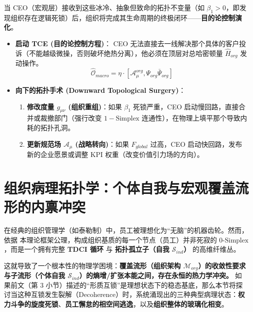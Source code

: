 
当 CEO（宏观层）接收到这些冰冷、抽象但致命的拓扑不变量（如 $\beta_1 > 0$，即发现组织存在逻辑死锁）后，组织将完成其生命周期的终极闭环——\textbf{目的论控制演化}。

\begin{itemize}
    \item \textbf{启动 TCE (目的论控制方程)}：
    CEO 无法直接去一线解决那个具体的客户投诉（不能越级微操，否则破坏绝热分离），他必须在顶层对总哈密顿量 $\hat{H}_{org}$ 发动操作。
    $$ \hat{\mathcal{O}}_{macro} = \eta \cdot \left[ \mathcal{A}_\mu^{org}, \Psi_{org} \bar{\Psi}_{org} \right] $$

    \item \textbf{向下的拓扑手术 (Downward Topological Surgery)}：
    \begin{enumerate}
        \item \textbf{修改度量 $g_{\mu\nu}$ (组织重组)}：如果 $\beta_1$ 死锁严重，CEO 启动慢回路，直接合并或裁撤部门（强行改变 $1-\text{Simplex}$ 连通性），在物理上填平那个导致内耗的拓扑孔洞。
        \item \textbf{更新规范场 $\mathcal{A}_\mu$ (战略转向)}：如果 $F_{global}$ 过高，CEO 启动快回路，发布新的企业愿景或调整 KPI 权重（改变价值引力场的方向）。
    \end{enumerate}
\end{itemize}

\section{组织病理拓扑学：个体自我与宏观覆盖流形的内禀冲突}
\label{sec:org_pathological_topology}

在经典的组织管理学（如泰勒制）中，员工被理想化为“无脑”的机器齿轮。然而，依据 本理论框架公理，构成组织基质的每一个节点（员工）并非死寂的 $0\text{-Simplex}$，而是一个拥有完整 \textbf{TDCI 循环} 与 \textbf{拓扑孤立子（自我 $\mathcal{S}_{ind}$）} 的高维纤维丛。

这就导致了一个根本性的物理学困境：\textbf{覆盖流形（组织架构 $\mathcal{M}_{org}$）的收敛性要求与子流形（个体自我 $\mathcal{S}_{ind}$）的熵增/扩张本能之间，存在永恒的热力学冲突。}
如果前文（第 3 小节）描述的“形质互锁”是理想状态下的稳态基底，那么本节将探讨当这种互锁发生裂解（Decoherence）时，系统涌现出的三种典型病理状态：\textbf{权力斗争的旋度死锁}、\textbf{员工懈怠的相空间逃逸}，以及\textbf{组织整体的玻璃化相变}。


